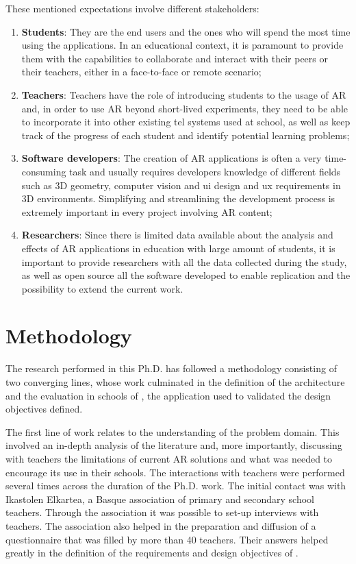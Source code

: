 These mentioned expectations involve different stakeholders: 
\begin{enumerate}
    \item \textbf{Students}: They are the end users and the ones who will spend the most time using the applications. In an educational context, it is paramount to provide them with the capabilities to collaborate and interact with their peers or their teachers, either in a face-to-face or remote scenario;
    \item \textbf{Teachers}: Teachers have the role of introducing students to the usage of AR and, in order to use AR beyond short-lived experiments, they need to be able to incorporate it into other existing \gls{tel} systems used at school, as well as keep track of the progress of each student and identify potential learning problems;
    \item \textbf{Software developers}: The creation of AR applications is often a very time-consuming task and usually requires developers knowledge of different fields such as 3D geometry, computer vision and \gls{ui} design and \gls{ux} requirements in 3D environments. Simplifying and streamlining the development process is extremely important in every project involving AR content;
    \item \textbf{Researchers}: Since there is limited data available about the analysis and effects of AR applications in education with large amount of students, it is important to provide researchers with all the data collected during the study, as well as open source all the software developed to enable replication and the possibility to extend the current work.
\end{enumerate}

\section{Methodology}\label{sec:methodology}
The research performed in this Ph.D. has followed a methodology consisting of two converging lines, whose work culminated in the definition of the \arch{} architecture and the evaluation in schools of \appname{}, the application used to validated the design objectives defined.

The first line of work relates to the understanding of the problem domain. This involved an in-depth analysis of the literature and, more importantly, discussing with teachers the limitations of current AR solutions and what was needed to encourage its use in their schools. The interactions with teachers were performed several times across the duration of the Ph.D. work. The initial contact was with Ikastolen Elkartea, a Basque association of primary and secondary school teachers. Through the association it was possible to set-up interviews with teachers. The association also helped in the preparation and diffusion of a questionnaire that was filled by more than 40 teachers. Their answers helped greatly in the definition of the requirements and design objectives of \arch.

